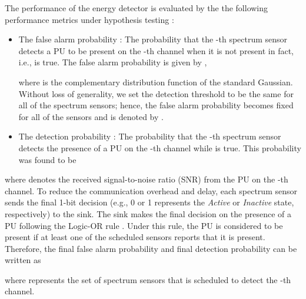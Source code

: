 \documentclass[journal]{IEEEtran} \ifCLASSINFOpdf
\begin{document}
The performance of the energy detector is evaluated by the the following performance metrics under hypothesis testing \cite{Atapattu:2014:}:
\begin{itemize}
\item The false alarm probability : The probability that the -th spectrum sensor detects a PU to be present on the -th channel when it is not present in fact, i.e.,  is true. The false alarm probability is given by \cite{Liang2008},

where  is the complementary distribution function of the standard Gaussian. Without loss of generality, we set the detection threshold to be the same for all of the spectrum sensors; hence, the false alarm probability becomes fixed for all of the sensors and is denoted by .
\item  The detection probability : The probability that the -th spectrum sensor detects the presence of a PU on the -th channel while  is true. This probability was found to be \cite{Liang2008}

\end{itemize}
where  denotes the received signal-to-noise ratio (SNR) from the PU on the -th channel. To reduce the communication overhead and delay, each spectrum sensor sends the final 1-bit decision (e.g., 0 or 1 represents the \textit{Active} or \textit{Inactive} state, respectively) to the sink. The sink makes the final decision on the presence of a PU following the Logic-OR rule \cite{Liang2008,Deng2012}. Under this rule, the PU is considered to be present if at least one of the scheduled sensors reports that it is present. Therefore, the final false alarm probability  and final detection probability  can be written as

where  represents the set of spectrum sensors that is scheduled to detect the -th channel.
\end{document}
